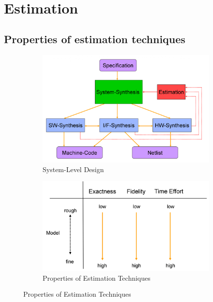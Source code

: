 \section{Estimation}
\subsection{Properties of estimation techniques}
\begin{figure}[h]
	\begin{center}
		\begin{subfigure}[b]{0.4\textwidth}
			\includegraphics[width=\textwidth]{images/System_level_design.png}
			\caption{System-Level Design}
		\end{subfigure}
		\hfill
		\begin{subfigure}[b]{0.5\textwidth}
			\includegraphics[width=\textwidth]{images/Estimation_properties.png}
			\caption{Properties of Estimation Techniques}
		\end{subfigure}
	\end{center}
\end{figure}

